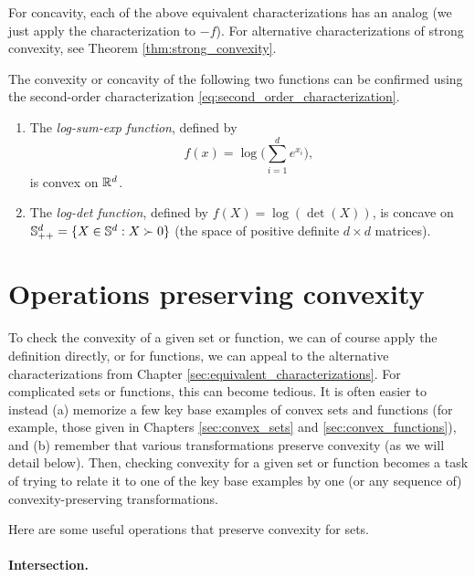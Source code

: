 \medskip

For concavity, each of the above equivalent characterizations has an analog
(we just apply the characterization to $-f$). For alternative
characterizations of strong convexity, see Theorem \ref{thm:strong_convexity}. 

\begin{Example} 
The convexity or concavity of the following two functions can be confirmed
using the second-order characterization
\eqref{eq:second_order_characterization}. 

\begin{enumerate}[label=\alph*.]
\item The \emph{log-sum-exp function}, defined by 
  \[
  f(x) = \log\bigg( \sum_{i=1}^d e^{x_i} \bigg),
  \]
  is convex on $\mathbb{R}^d$.

\item The \emph{log-det function}, defined by $f(X) = \log(\det(X))$, is concave
  on $\mathbb{S}_{++}^d = \{X \in \mathbb{S}^d : X \succ 0\}$ (the space of positive definite
  $d \times d$ matrices). 
\end{enumerate}
\end{Example}

\section{Operations preserving convexity}
\label{sec:operations_preserving_convexity}

To check the convexity of a given set or function, we can of course apply the
definition directly, or for functions, we can appeal to the alternative
characterizations from Chapter \ref{sec:equivalent_characterizations}. For
complicated sets or functions, this can become tedious. It is often easier to
instead (a) memorize a few key base examples of convex sets and functions (for
example, those given in Chapters \ref{sec:convex_sets} and
\ref{sec:convex_functions}), and (b) remember that various transformations
preserve convexity (as we will detail below). Then, checking convexity for a
given set or function becomes a task of trying to relate it to one of the key
base examples by one (or any sequence of) convexity-preserving transformations.

Here are some useful operations that preserve convexity for sets.

\paragraph{Intersection.} 

